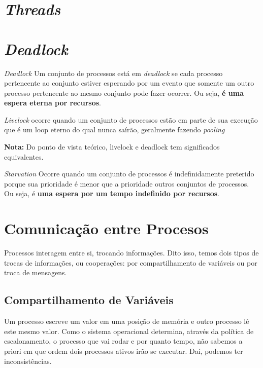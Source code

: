 \section{\textit{Threads}}


\section{\textit{Deadlock}}
\begin{definicao}{\textit{Deadlock}}
  Um conjunto de processos está em \textit{deadlock} se cada processo pertencente ao conjunto estiver esperando por um evento que somente um outro processo pertencente ao mesmo conjunto pode fazer ocorrer. Ou seja, \textbf{é uma espera eterna por recursos}.
\end{definicao}

\begin{definicao}{\textit{Livelock}}
  ocorre quando um conjunto de processos estão em parte de sua execução que é um loop eterno do qual nunca saírão, geralmente fazendo \textit{pooling}
\end{definicao}

\textbf{Nota:} Do ponto de vista teórico, livelock e deadlock tem significados equivalentes.

\begin{definicao}{\textit{Starvation}}
  Ocorre quando um conjunto de processos é indefinidamente preterido porque sua prioridade é menor que a prioridade outros conjuntos de processos. Ou seja, é \textbf{uma espera por um tempo indefinido por recursos}.
\end{definicao}










\section{Comunicação entre Procesos}
Processos interagem entre si, trocando informações. Dito isso, temos dois tipos de trocas de informações, ou cooperações: por compartilhamento de variáveis ou por troca de mensagens.

\subsection{Compartilhamento de Variáveis}
Um processo escreve um valor em uma posição de memória e outro processo lê este mesmo valor. Como o sistema operacional determina, através da política de escalonamento, o processo que vai rodar e por quanto tempo, não sabemos a priori em
que ordem dois processos ativos irão se executar. Daí, podemos ter inconsistências. %

